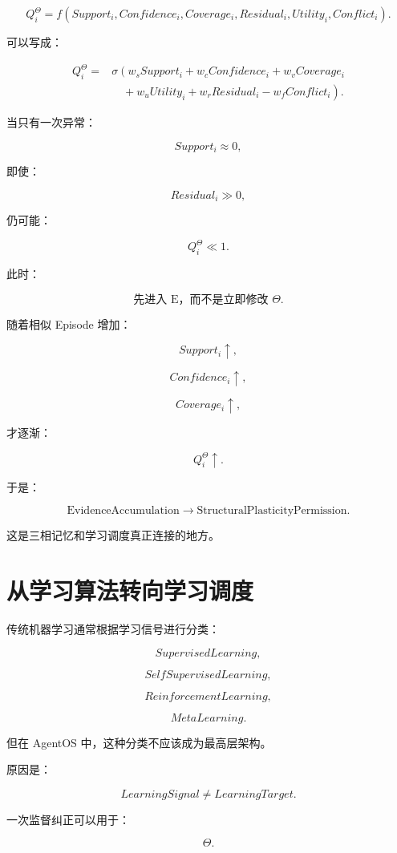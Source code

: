 \[
\boxed{
Q_i^\Theta
=
f(
Support_i,
Confidence_i,
Coverage_i,
Residual_i,
Utility_i,
Conflict_i
).
}
\]

可以写成：

\[
\begin{aligned}
Q_i^\Theta
={}&
\sigma
\left(
w_sSupport_i
+
w_cConfidence_i
+
w_vCoverage_i
{}\right.\\
&\left.\quad+
w_uUtility_i
+
w_rResidual_i
-
w_fConflict_i
\right).
\end{aligned}
\]

当只有一次异常：

\[
Support_i\approx0,
\]

即使：

\[
Residual_i\gg0,
\]

仍可能：

\[
Q_i^\Theta\ll1.
\]

此时：

\[
\boxed{
\text{先进入 E，而不是立即修改 }\Theta.
}
\]

随着相似 Episode 增加：

\[
Support_i\uparrow,
\]

\[
Confidence_i\uparrow,
\]

\[
Coverage_i\uparrow,
\]

才逐渐：

\[
Q_i^\Theta\uparrow.
\]

于是：

\[
\boxed{
\text{EvidenceAccumulation}
\rightarrow
\text{StructuralPlasticityPermission}.
}
\]

这是三相记忆和学习调度真正连接的地方。


\section{从学习算法转向学习调度}

传统机器学习通常根据学习信号进行分类：

\[
SupervisedLearning,
\]

\[
SelfSupervisedLearning,
\]

\[
ReinforcementLearning,
\]

\[
MetaLearning.
\]

但在 AgentOS 中，这种分类不应该成为最高层架构。

原因是：

\[
\boxed{
LearningSignal
\neq
LearningTarget.
}
\]

一次监督纠正可以用于：

\[
\Theta.
\]

